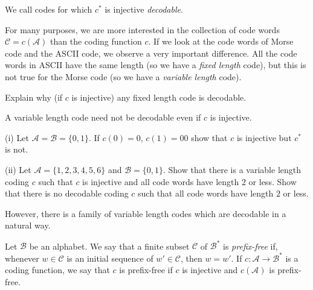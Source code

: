 We call codes for which $c^{*}$ is injective \emph{decodable}.

For many purposes, we are more interested
in the collection of code words ${\mathcal C}=c({\mathcal A})$
than the coding function $c$. If we look
at the code words of Morse code and the ASCII code, we
observe a very important difference.
All the code words in ASCII have the same length 
(so we have a \emph{fixed length} code),
but this is not true for the Morse code
(so we have a \emph{variable length} code).
\begin{exercise}\label{E;fix length} Explain why (if $c$ is injective) 
any fixed length code
is  decodable.
\end{exercise}

A variable length code need not be decodable even 
if $c$ is injective.
\begin{exercise}\label{E;decodable} 
(i) Let ${\mathcal A}={\mathcal B}=\{0,1\}$. If
$c(0)=0$, $c(1)=00$ show that $c$ is injective but $c^{*}$ is not.
 
(ii) Let ${\mathcal A}=\{1,2,3,4,5,6\}$ and ${\mathcal B}=\{0,1\}$.
Show that there is a variable length coding $c$ such that
$c$ is injective and all code words have length $2$ or less.
Show that there is no decodable coding $c$ such that
all code words have length $2$ or less.
\end{exercise}

However, there is a family of variable length codes
which are decodable in a natural way.
\begin{definition} Let ${\mathcal B}$ be an alphabet. We say that
a finite subset ${\mathcal C}$ of ${\mathcal B}^{*}$
is \emph{prefix-free} if, 
whenever $w\in{\mathcal C}$ is an initial sequence
of $w'\in{\mathcal C}$, then $w=w'$. 
If $c:{\mathcal A}\rightarrow{\mathcal B}^{*}$
is a coding function, we say that $c$ is prefix-free if $c$ is injective
and $c({\mathcal A})$
is prefix-free.
\end{definition}

